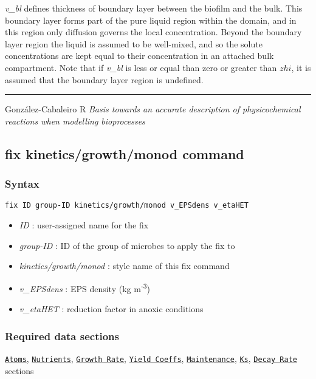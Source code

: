 \documentclass[11pt,a4paper,openright]{article}
\begin{document}
{\it v\_bl } defines thickness of boundary layer between the biofilm and the bulk. This boundary layer forms part of the
pure liquid region within the domain, and in this region only diffusion governs the local concentration.
Beyond the boundary layer region the liquid is assumed to be well-mixed, and so the solute concentrations are
kept equal to their concentration in an attached bulk compartment. Note that if {\it v\_bl } is less or equal than zero or greater than $zhi$, it is assumed that the boundary layer region is undefined.

\noindent\rule{13cm}{0.4pt}
González-Cabaleiro R {\it Basis towards an accurate description of physicochemical reactions when modelling bioprocesses}
\newpage

\subsection{fix kinetics/growth/monod command}
\label{fkineticsmonod}

\subsubsection*{Syntax}

\begin{Verbatim}[frame=single]
fix ID group-ID kinetics/growth/monod v_EPSdens v_etaHET
\end{Verbatim}

\begin{itemize} [nosep]
\item
	{\it ID }: user-assigned name for the fix
\item
	{\it group-ID }: ID of the group of microbes to apply the fix to
\item
	{\it kinetics/growth/monod }: style name of this fix command
\item
	{\it v\_EPSdens  }: EPS density (kg m\textsuperscript{-3})
\item
	{\it v\_etaHET }: reduction factor in anoxic conditions
	 	
\end{itemize}

\subsubsection*{Required data sections}
\hyperref[satom]{\tt Atoms}, \hyperref[snutrients]{\tt Nutrients}, 
\hyperref[sgrowth]{\tt Growth Rate},
\hyperref[syield]{\tt Yield Coeffs},
\hyperref[smaintain]{\tt Maintenance},
\hyperref[sks]{\tt Ks},
\hyperref[sdecay]{\tt Decay Rate}  sections \\
\end{document}
